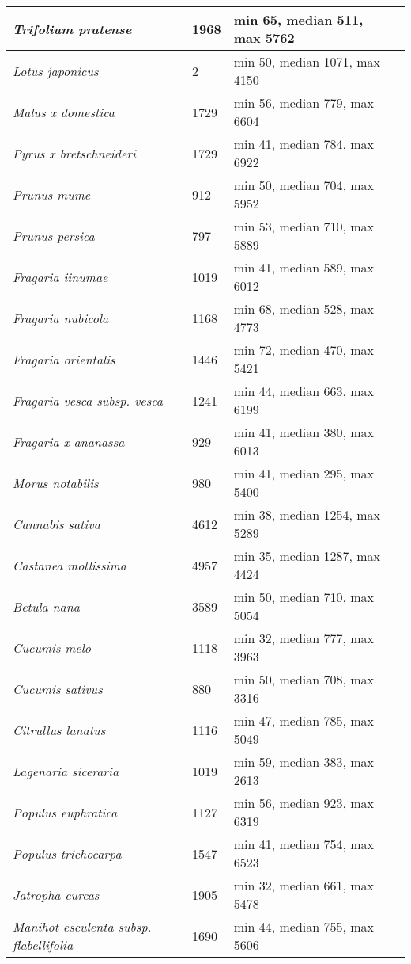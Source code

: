 {\begin{longtable}{| L{4cm} | L{2cm}  | L{5cm} | L{4cm} |}
\textit{Trifolium pratense} & 1968 & min 65, median 511, max 5762 & \\ \hline
\textit{Lotus japonicus} & 2 & min 50, median 1071, max 4150 & \\ \hline
\textit{Malus x domestica} & 1729 & min 56, median 779, max 6604 & \\ \hline
\textit{Pyrus x bretschneideri} & 1729 & min 41, median 784, max 6922 & \\ \hline
\textit{Prunus mume} & 912 & min 50, median 704, max 5952 & \\ \hline
\textit{Prunus persica} & 797 & min 53, median 710, max 5889 & \\ \hline
\textit{Fragaria iinumae} & 1019 & min 41, median 589, max 6012 & \\ \hline
\textit{Fragaria nubicola} & 1168 & min 68, median 528, max 4773 & \\ \hline
\textit{Fragaria orientalis} & 1446 & min 72, median 470, max 5421 & \\ \hline
\textit{Fragaria vesca subsp. vesca} & 1241 & min 44, median 663, max 6199 & \\ \hline
\textit{Fragaria x ananassa} & 929 & min 41, median 380, max 6013 & \\ \hline
\textit{Morus notabilis} & 980 & min 41, median 295, max 5400 & \\ \hline
\textit{Cannabis sativa} & 4612 & min 38, median 1254, max 5289 & \\ \hline
\textit{Castanea mollissima} & 4957 & min 35, median 1287, max 4424 & \\ \hline
\textit{Betula nana} & 3589 & min 50, median 710, max 5054 & \\ \hline
\textit{Cucumis melo} & 1118 & min 32, median 777, max 3963 & \\ \hline
\textit{Cucumis sativus} & 880 & min 50, median 708, max 3316 & \\ \hline
\textit{Citrullus lanatus} & 1116 & min 47, median 785, max 5049 & \\ \hline
\textit{Lagenaria siceraria} & 1019 & min 59, median 383, max 2613 & \\ \hline
\textit{Populus euphratica} & 1127 & min 56, median 923, max 6319 & \\ \hline
\textit{Populus trichocarpa} & 1547 & min 41, median 754, max 6523 & \\ \hline
\textit{Jatropha curcas} & 1905 & min 32, median 661, max 5478 & \\ \hline
\textit{Manihot esculenta subsp. flabellifolia} & 1690 & min 44, median 755, max 5606 & \\ \hline

\end{longtable}}
